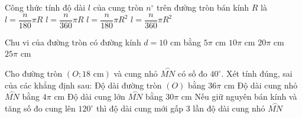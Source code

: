 
\begin{ex}%
	Công thức tính độ dài $l$ của cung tròn $n^\circ$ trên đường tròn bán kính $R$ là
	\choice
	{\True $l = \dfrac{n}{180}\pi R$}
	{$l = \dfrac{n}{360}\pi R$}
	{$l = \dfrac{n}{180}\pi R^2$}
	{$l = \dfrac{n}{360}\pi R^2$}
\end{ex}

\begin{ex}%
	Chu vi của đường tròn có đường kính $d = 10\text{ cm}$ bằng
	\choice
	{$5\pi\text{ cm}$}
	{\True $10\pi\text{ cm}$}
	{$20\pi\text{ cm}$}
	{$25\pi\text{ cm}$}
\end{ex}

\begin{ex}%
	Cho đường tròn $(O; 18\text{ cm})$ và cung nhỏ $\overset{\frown}{MN}$ có số đo $40^\circ$. Xét tính đúng, sai của các khẳng định sau:
	\choiceTF
	{\True Độ dài đường tròn $(O)$ bằng $36\pi\text{ cm}$}
	{\True Độ dài cung nhỏ $\overset{\frown}{MN}$ bằng $4\pi\text{ cm}$}
	{Độ dài cung lớn $\overset{\frown}{MN}$ bằng $30\pi\text{ cm}$}
	{\True Nếu giữ nguyên bán kính và tăng số đo cung lên $120^\circ$ thì độ dài cung mới gấp $3$ lần độ dài cung nhỏ $\overset{\frown}{MN}$}
\end{ex}

